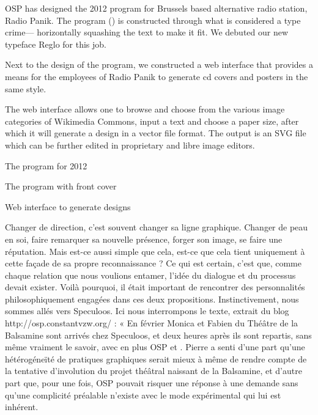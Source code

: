 
\subject{Radio Panik}

OSP has designed the 2012 program for Brussels based alternative radio
station, Radio Panik. The program () is constructed
through what is considered a type crime--- horizontally squashing the
text to make it fit. We debuted our new typeface Reglo for this job.

Next to the design of the program, we constructed a web interface that
provides a means for the employees of Radio Panik to generate cd covers
and posters in the same style.

The web interface allows one to browse and choose from the various image
categories of Wikimedia Commons, input a text and choose a paper size,
after which it will generate a design in a vector file format. The
output is an SVG file which can be further edited in proprietary and
libre image editors.

{} The program for 2012

{} The program with front cover

{} Web interface to
generate designs







\subject{La Balsamine}


Changer de direction, c'est souvent changer sa ligne graphique. Changer
de peau en soi, faire remarquer sa nouvelle présence, forger son image,
se faire une réputation. Mais est-ce aussi simple que cela, est-ce que
cela tient uniquement à cette façade de sa propre reconnaissance ? Ce
qui est certain, c'est que, comme chaque relation que nous voulions
entamer, l'idée du dialogue et du processus devait exister. Voilà
pourquoi, il était important de rencontrer des personnalités
philosophiquement engagées dans ces deux propositions. Instinctivement,
nous sommes allés vers Speculoos. Ici nous interrompons le texte,
extrait du blog http://osp.constantvzw.org/ : « En février Monica et
Fabien du Théâtre de la Balsamine sont arrivés chez Speculoos, et deux
heures après ils sont repartis, sans même vraiment le savoir, avec en
plus OSP et . Pierre a senti d'une part qu'une hétérogéneïté de
pratiques graphiques serait mieux à même de rendre compte de la
tentative d'involution du projet théâtral naissant de la Balsamine, et
d'autre part que, pour une fois, OSP pouvait risquer une réponse à une
demande sans qu'une complicité préalable n'existe avec le mode
expérimental qui lui est inhérent.

